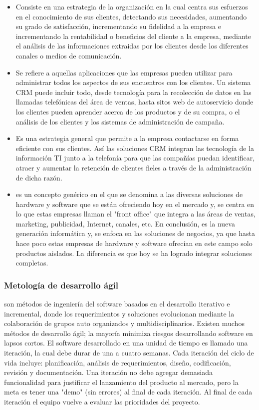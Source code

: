\begin{itemize}
	\item Consiste en una estrategia de la organizaci\'on en la cual centra sus esfuerzos en el conocimiento de sus clientes, detectando sus necesidades, aumentando su grado de satisfacci\'on, incrementando su fidelidad a la empresa e incrementando la rentabilidad o beneficios del cliente a la empresa, mediante el an\'alisis de las informaciones extraidas por los clientes desde los diferentes canales o medios de comunicaci\'on.
	\item Se refiere a aquellas aplicaciones que las empresas pueden utilizar para administrar todos los aspectos de sus encuentros con los clientes. Un sistema CRM puede incluir todo, desde tecnolog\'ia para la recolecci\'on de datos en las llamadas telef\'onicas del \'area de ventas, hasta sitos web de autoservicio donde los clientes pueden aprender acerca de los productos y de su compra, o el an\'alisis de los clientes y los sistemas de administraci\'on de campa\~na.
	\item Es una estrategia general que permite a la empresa contactarse en forma eficiente con sus clientes. As\'i las soluciones CRM integran las tecnolog\'ia de la informaci\'on TI junto a la telefon\'ia para que las compa\~n\'ias puedan identificar, atraer y aumentar la retenci\'on de clientes fieles a trav\'es de la administraci\'on de dicha raz\'on.
	\item es un concepto gen\'erico en el que se denomina a las diversas soluciones de hardware y software que se est\'an ofreciendo hoy en el mercado y, se centra en lo que estas empresas llaman el "front office" que integra a las \'areas de ventas, marketing, publicidad, Internet, canales, etc. En conclusi\'on, es la nueva generaci\'on inform\'atica y, se enfoca en las soluciones de negocios, ya que hasta hace poco estas empresas de hardware y software ofrec\'ian en este campo solo productos aislados. La diferencia es que hoy se ha logrado integrar soluciones completas.
\end{itemize}
\subsubsection{Metolog\'ia de desarrollo \'agil } son m\'etodos de ingenier\'ia del software basados en el desarrollo iterativo e incremental, donde los requerimientos y soluciones evolucionan mediante la colaboraci\'on de grupos auto organizados y multidisciplinarios. Existen muchos m\'etodos de desarrollo \'agil; la mayor\'ia minimiza riesgos desarrollando software en lapsos cortos. El software desarrollado en una unidad de tiempo es llamado una iteraci\'on, la cual debe durar de una a cuatro semanas. Cada iteraci\'on del ciclo de vida incluye: planificaci\'on, an\'alisis de requerimientos, dise\~no, codificaci\'on, revisi\'on y documentaci\'on. Una iteraci\'on no debe agregar demasiada funcionalidad para justificar el lanzamiento del producto al mercado, pero la meta es tener una "demo" (sin errores) al final de cada iteraci\'on. Al final de cada iteraci\'on el equipo vuelve a evaluar las prioridades del proyecto.%
